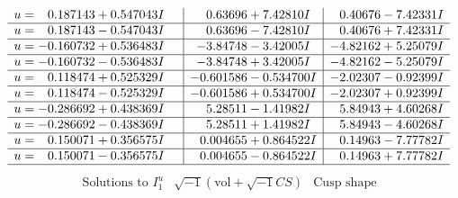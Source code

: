 \documentclass[1p]{elsarticle_modified}
\theoremstyle{definition}
\newcommand{\I}{\sqrt{-1}}
\begin{document}
$$\begin{array}{c|c|c}
\begin{aligned}
u &= \phantom{-}0.187143 + 0.547043 I\end{aligned}
 & \phantom{-}0.63696 + 7.42810 I & \phantom{-}0.40676 - 7.42331 I \\ \hline\begin{aligned}
u &= \phantom{-}0.187143 - 0.547043 I\end{aligned}
 & \phantom{-}0.63696 - 7.42810 I & \phantom{-}0.40676 + 7.42331 I \\ \hline\begin{aligned}
u &= -0.160732 + 0.536483 I\end{aligned}
 & -3.84748 - 3.42005 I & -4.82162 + 5.25079 I \\ \hline\begin{aligned}
u &= -0.160732 - 0.536483 I\end{aligned}
 & -3.84748 + 3.42005 I & -4.82162 - 5.25079 I \\ \hline\begin{aligned}
u &= \phantom{-}0.118474 + 0.525329 I\end{aligned}
 & -0.601586 - 0.534700 I & -2.02307 - 0.92399 I \\ \hline\begin{aligned}
u &= \phantom{-}0.118474 - 0.525329 I\end{aligned}
 & -0.601586 + 0.534700 I & -2.02307 + 0.92399 I \\ \hline\begin{aligned}
u &= -0.286692 + 0.438369 I\end{aligned}
 & \phantom{-}5.28511 - 1.41982 I & \phantom{-}5.84943 + 4.60268 I \\ \hline\begin{aligned}
u &= -0.286692 - 0.438369 I\end{aligned}
 & \phantom{-}5.28511 + 1.41982 I & \phantom{-}5.84943 - 4.60268 I \\ \hline\begin{aligned}
u &= \phantom{-}0.150071 + 0.356575 I\end{aligned}
 & \phantom{-}0.004655 + 0.864522 I & \phantom{-}0.14963 - 7.77782 I \\ \hline\begin{aligned}
u &= \phantom{-}0.150071 - 0.356575 I\end{aligned}
 & \phantom{-}0.004655 - 0.864522 I & \phantom{-}0.14963 + 7.77782 I\\
 \hline 
 \end{array}$$\newpage$$\begin{array}{c|c|c}  
\text{Solutions to }I^u_{1}& \I (\text{vol} + \sqrt{-1}CS) & \text{Cusp shape}\\

\end{array}$$
\end{document}
